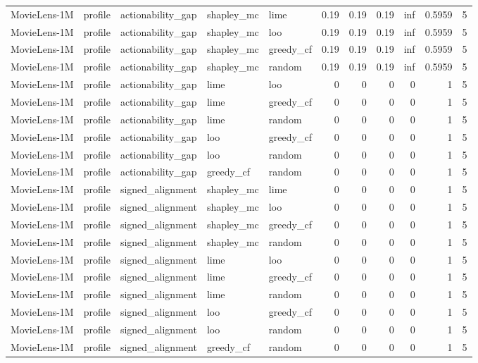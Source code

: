 \begin{table}[t]
{\begin{tabular}{lllllrrrrrr}
MovieLens-1M & profile & actionability\_gap & shapley\_mc & lime & 0.19 & 0.19 & 0.19 & inf & 0.5959 & 5 \\
MovieLens-1M & profile & actionability\_gap & shapley\_mc & loo & 0.19 & 0.19 & 0.19 & inf & 0.5959 & 5 \\
MovieLens-1M & profile & actionability\_gap & shapley\_mc & greedy\_cf & 0.19 & 0.19 & 0.19 & inf & 0.5959 & 5 \\
MovieLens-1M & profile & actionability\_gap & shapley\_mc & random & 0.19 & 0.19 & 0.19 & inf & 0.5959 & 5 \\
MovieLens-1M & profile & actionability\_gap & lime & loo & 0 & 0 & 0 & 0 & 1 & 5 \\
MovieLens-1M & profile & actionability\_gap & lime & greedy\_cf & 0 & 0 & 0 & 0 & 1 & 5 \\
MovieLens-1M & profile & actionability\_gap & lime & random & 0 & 0 & 0 & 0 & 1 & 5 \\
MovieLens-1M & profile & actionability\_gap & loo & greedy\_cf & 0 & 0 & 0 & 0 & 1 & 5 \\
MovieLens-1M & profile & actionability\_gap & loo & random & 0 & 0 & 0 & 0 & 1 & 5 \\
MovieLens-1M & profile & actionability\_gap & greedy\_cf & random & 0 & 0 & 0 & 0 & 1 & 5 \\
MovieLens-1M & profile & signed\_alignment & shapley\_mc & lime & 0 & 0 & 0 & 0 & 1 & 5 \\
MovieLens-1M & profile & signed\_alignment & shapley\_mc & loo & 0 & 0 & 0 & 0 & 1 & 5 \\
MovieLens-1M & profile & signed\_alignment & shapley\_mc & greedy\_cf & 0 & 0 & 0 & 0 & 1 & 5 \\
MovieLens-1M & profile & signed\_alignment & shapley\_mc & random & 0 & 0 & 0 & 0 & 1 & 5 \\
MovieLens-1M & profile & signed\_alignment & lime & loo & 0 & 0 & 0 & 0 & 1 & 5 \\
MovieLens-1M & profile & signed\_alignment & lime & greedy\_cf & 0 & 0 & 0 & 0 & 1 & 5 \\
MovieLens-1M & profile & signed\_alignment & lime & random & 0 & 0 & 0 & 0 & 1 & 5 \\
MovieLens-1M & profile & signed\_alignment & loo & greedy\_cf & 0 & 0 & 0 & 0 & 1 & 5 \\
MovieLens-1M & profile & signed\_alignment & loo & random & 0 & 0 & 0 & 0 & 1 & 5 \\
MovieLens-1M & profile & signed\_alignment & greedy\_cf & random & 0 & 0 & 0 & 0 & 1 & 5 \\

\end{tabular}}
\end{table}
